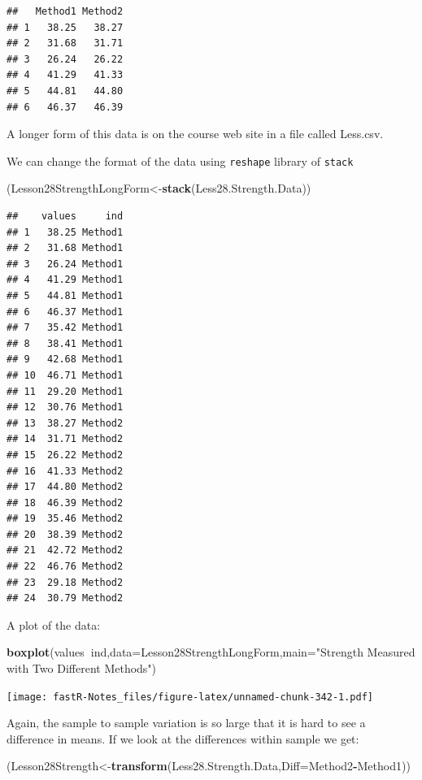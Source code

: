 \documentclass[]{book}
\newenvironment{Shaded}{\begin{snugshade}}{\end{snugshade}}
\newcommand{\KeywordTok}[1]{\textcolor[rgb]{0.13,0.29,0.53}{\textbf{#1}}}
\newcommand{\DataTypeTok}[1]{\textcolor[rgb]{0.13,0.29,0.53}{#1}}
\newcommand{\StringTok}[1]{\textcolor[rgb]{0.31,0.60,0.02}{#1}}
\newcommand{\OperatorTok}[1]{\textcolor[rgb]{0.81,0.36,0.00}{\textbf{#1}}}
\newcommand{\NormalTok}[1]{#1}
\theoremstyle{definition}
\theoremstyle{definition}
\theoremstyle{definition}
\theoremstyle{remark}
\begin{document}
\begin{verbatim}
##   Method1 Method2
## 1   38.25   38.27
## 2   31.68   31.71
## 3   26.24   26.22
## 4   41.29   41.33
## 5   44.81   44.80
## 6   46.37   46.39
\end{verbatim}

A longer form of this data is on the course web site in a file called
Less.csv.

We can change the format of the data using \texttt{reshape} library of
\texttt{stack}

\begin{Shaded}
\begin{Highlighting}[]
\NormalTok{(Lesson28StrengthLongForm<-}\KeywordTok{stack}\NormalTok{(Less28.Strength.Data))}
\end{Highlighting}
\end{Shaded}

\begin{verbatim}
##    values     ind
## 1   38.25 Method1
## 2   31.68 Method1
## 3   26.24 Method1
## 4   41.29 Method1
## 5   44.81 Method1
## 6   46.37 Method1
## 7   35.42 Method1
## 8   38.41 Method1
## 9   42.68 Method1
## 10  46.71 Method1
## 11  29.20 Method1
## 12  30.76 Method1
## 13  38.27 Method2
## 14  31.71 Method2
## 15  26.22 Method2
## 16  41.33 Method2
## 17  44.80 Method2
## 18  46.39 Method2
## 19  35.46 Method2
## 20  38.39 Method2
## 21  42.72 Method2
## 22  46.76 Method2
## 23  29.18 Method2
## 24  30.79 Method2
\end{verbatim}

A plot of the data:

\begin{Shaded}
\begin{Highlighting}[]
\KeywordTok{boxplot}\NormalTok{(values}\OperatorTok{~}\NormalTok{ind,}\DataTypeTok{data=}\NormalTok{Lesson28StrengthLongForm,}\DataTypeTok{main=}\StringTok{"Strength Measured with Two Different Methods"}\NormalTok{)}
\end{Highlighting}
\end{Shaded}

\texttt{[image: fastR-Notes\_files/figure-latex/unnamed-chunk-342-1.pdf]}

Again, the sample to sample variation is so large that it is hard to see
a difference in means. If we look at the differences within sample we
get:

\begin{Shaded}
\begin{Highlighting}[]
\NormalTok{(Lesson28Strength<-}\KeywordTok{transform}\NormalTok{(Less28.Strength.Data,}\DataTypeTok{Diff=}\NormalTok{Method2}\OperatorTok{-}\NormalTok{Method1))}
\end{Highlighting}
\end{Shaded}
\end{document}
